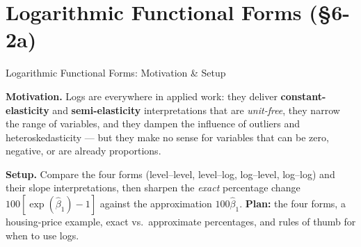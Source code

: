 \documentclass[aspectratio=169, 12pt]{beamer}
\begin{document}
\section{Logarithmic Functional Forms (\S6-2a)}

\begin{frame}{Logarithmic Functional Forms: Motivation \& Setup}

  \begin{highlightbox}
    \textbf{Motivation.} Logs are everywhere in applied work: they deliver
    \textbf{constant-elasticity} and \textbf{semi-elasticity} interpretations that are
    \emph{unit-free}, they narrow the range of variables, and they dampen the influence
    of outliers and heteroskedasticity --- but they make no sense for variables that can
    be zero, negative, or are already proportions.
  \end{highlightbox}

  \begin{keybox}
    \textbf{Setup.} Compare the four forms (level--level, level--log, log--level,
    log--log) and their slope interpretations, then sharpen the \emph{exact} percentage
    change $100[\exp(\hat\beta_1)-1]$ against the approximation $100\hat\beta_1$.
    \textbf{Plan:} the four forms, a housing-price example, exact vs.\ approximate
    percentages, and rules of thumb for when to use logs.
  \end{keybox}

\end{frame}
\end{document}
